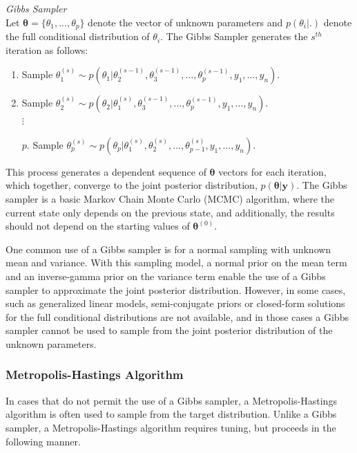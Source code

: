 \documentclass[12pt]{article}\usepackage[]{graphicx}\usepackage[]{color}
\begin{document}
\begin{mdframed}
\textit{Gibbs Sampler} \\
Let $\bm{\theta} = \{\theta_1, ..., \theta_p\}$ denote the vector of unknown parameters and $p(\theta_i|.)$ denote the full conditional distribution of $\theta_i$. The Gibbs Sampler generates the $s^{th}$ iteration as follows:
\begin{enumerate}
\item Sample $\theta_1^{(s)} \sim p(\theta_1|\theta_2^{(s-1)}, \theta_3^{(s-1)}, \dots, \theta_p^{(s-1)}, y_1, \dots, y_n)$. 
\item Sample $\theta_2^{(s)} \sim p(\theta_2|\theta_1^{(s)}, \theta_3^{(s-1)}, \dots, \theta_p^{(s-1)}, y_1, \dots, y_n)$.\\	
$\vdots$ \\[-14mm]
\item[$p$.] Sample $\theta_p^{(s)} \sim p(\theta_p|\theta_1^{(s)}, \theta_2^{(s)}, \dots, \theta_{p-1}^{(s)}, y_1, \dots , y_n)$. 
\end{enumerate}
\end{mdframed}

\noindent This process generates a dependent sequence of $\bm{\theta}$ vectors for each iteration, which together, converge to the joint posterior distribution, $p(\bm{\theta}|\bm{y})$. The Gibbs sampler is a basic Markov Chain Monte Carlo (MCMC) algorithm, where the current state only depends on the previous state, and additionally, the results should not depend on the starting values of $\bm{\theta}^{(0)}$.

One common use of a Gibbs sampler is for a normal sampling with unknown mean and variance. With this sampling model, a normal prior on the mean term and an inverse-gamma prior on the variance term enable the use of a Gibbs sampler to approximate the joint posterior distribution. However, in some cases, such as generalized linear models, semi-conjugate priors or closed-form solutions for the full conditional distributions are not available, and in those cases a Gibbs sampler cannot be used to sample from the joint posterior distribution of the unknown parameters. 

\subsubsection{Metropolis-Hastings Algorithm}

In cases that do not permit the use of a Gibbs sampler, a Metropolis-Hastings algorithm is often used to sample from the target distribution. Unlike a Gibbs sampler, a Metropolis-Hastings algorithm requires tuning, but proceeds in the following manner. 
\end{document}
